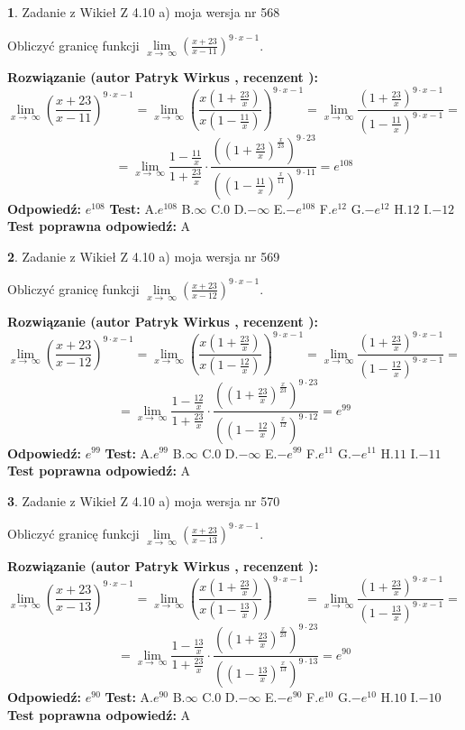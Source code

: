 \documentclass[12pt, a4paper]{article}
\theoremstyle{definition} %
\newtheorem{zad}{}
\newcommand{\zadStart}[1]{\begin{zad}#1\newline}
\newcommand{\zadStop}{\end{zad}}
\newcommand{\rozwStart}[2]{\noindent \textbf{Rozwiązanie (autor #1 , recenzent #2): }\newline}
\newcommand{\rozwStop}{\newline}
\newcommand{\odpStart}{\noindent \textbf{Odpowiedź:}\newline}
\newcommand{\odpStop}{\newline}
\newcommand{\testStart}{\noindent \textbf{Test:}\newline}
\newcommand{\testStop}{\newline}
\newcommand{\kluczStart}{\noindent \textbf{Test poprawna odpowiedź:}\newline}
\newcommand{\kluczStop}{\newline}
\begin{document}
\zadStart{Zadanie z Wikieł Z 4.10 a) moja wersja nr 568}

Obliczyć granicę funkcji  $\lim\limits_{x\to\ \infty}(\frac{x+23}{x-11})^{9\cdot x-1}$.
\zadStop
\rozwStart{Patryk Wirkus}{}
$$\lim\limits_{x\to\ \infty}(\frac{x+23}{x-11})^{9\cdot x-1} = \lim\limits_{x\to\ \infty}(\frac{x(1+\frac{23}{x})}{x(1-\frac{11}{x})})^{9\cdot x-1}=\lim\limits_{x\to\ \infty}\frac{(1+\frac{23}{x})^{9\cdot x-1}}{(1-\frac{11}{x})^{9\cdot x-1}}=$$
$$=\lim\limits_{x\to\ \infty}\frac{1-\frac{11}{x}}{1+\frac{23}{x}}\cdot\frac{((1+\frac{23}{x})^{\frac{x}{23}})^{9\cdot23}}{((1-\frac{11}{x})^{\frac{x}{11}})^{9\cdot11}}=e^{108}$$
\rozwStop
\odpStart
$e^{108}$
\odpStop
\testStart
A.$e^{108}$ B.$\infty$ C.$0$ D.$-\infty$ E.$-e^{108}$
F.$e^{12}$ G.$-e^{12}$
H.$12$
I.$-12$
\testStop
\kluczStart
A
\kluczStop



\zadStart{Zadanie z Wikieł Z 4.10 a) moja wersja nr 569}

Obliczyć granicę funkcji  $\lim\limits_{x\to\ \infty}(\frac{x+23}{x-12})^{9\cdot x-1}$.
\zadStop
\rozwStart{Patryk Wirkus}{}
$$\lim\limits_{x\to\ \infty}(\frac{x+23}{x-12})^{9\cdot x-1} = \lim\limits_{x\to\ \infty}(\frac{x(1+\frac{23}{x})}{x(1-\frac{12}{x})})^{9\cdot x-1}=\lim\limits_{x\to\ \infty}\frac{(1+\frac{23}{x})^{9\cdot x-1}}{(1-\frac{12}{x})^{9\cdot x-1}}=$$
$$=\lim\limits_{x\to\ \infty}\frac{1-\frac{12}{x}}{1+\frac{23}{x}}\cdot\frac{((1+\frac{23}{x})^{\frac{x}{23}})^{9\cdot23}}{((1-\frac{12}{x})^{\frac{x}{12}})^{9\cdot12}}=e^{99}$$
\rozwStop
\odpStart
$e^{99}$
\odpStop
\testStart
A.$e^{99}$ B.$\infty$ C.$0$ D.$-\infty$ E.$-e^{99}$
F.$e^{11}$ G.$-e^{11}$
H.$11$
I.$-11$
\testStop
\kluczStart
A
\kluczStop



\zadStart{Zadanie z Wikieł Z 4.10 a) moja wersja nr 570}

Obliczyć granicę funkcji  $\lim\limits_{x\to\ \infty}(\frac{x+23}{x-13})^{9\cdot x-1}$.
\zadStop
\rozwStart{Patryk Wirkus}{}
$$\lim\limits_{x\to\ \infty}(\frac{x+23}{x-13})^{9\cdot x-1} = \lim\limits_{x\to\ \infty}(\frac{x(1+\frac{23}{x})}{x(1-\frac{13}{x})})^{9\cdot x-1}=\lim\limits_{x\to\ \infty}\frac{(1+\frac{23}{x})^{9\cdot x-1}}{(1-\frac{13}{x})^{9\cdot x-1}}=$$
$$=\lim\limits_{x\to\ \infty}\frac{1-\frac{13}{x}}{1+\frac{23}{x}}\cdot\frac{((1+\frac{23}{x})^{\frac{x}{23}})^{9\cdot23}}{((1-\frac{13}{x})^{\frac{x}{13}})^{9\cdot13}}=e^{90}$$
\rozwStop
\odpStart
$e^{90}$
\odpStop
\testStart
A.$e^{90}$ B.$\infty$ C.$0$ D.$-\infty$ E.$-e^{90}$
F.$e^{10}$ G.$-e^{10}$
H.$10$
I.$-10$
\testStop
\kluczStart
A
\kluczStop
\end{document}
